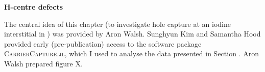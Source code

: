 \vspace{\frontmatterbaselineskip}

\textbf{H-centre defects}

The central idea of this chapter (to investigate hole capture at an iodine interstitial in ) was provided by Aron Walsh. Sunghyun Kim and Samantha Hood provided early (pre-publication) access to the software package \textsc{CarrierCapture.jl}, which I used to analyse the data presented in Section . Aron Walsh prepared figure X.